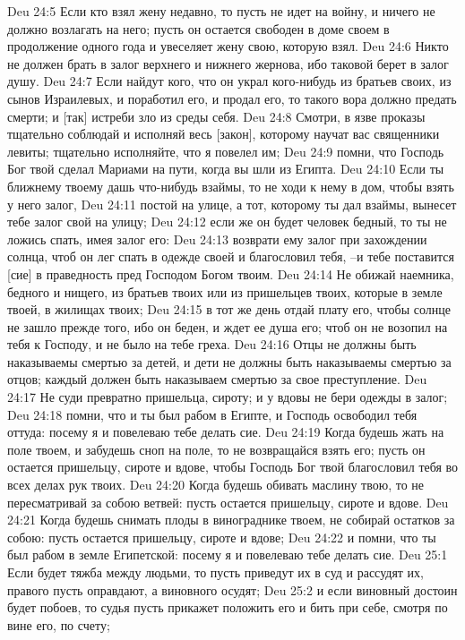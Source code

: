 Deu 24:5  Если кто взял жену недавно, то пусть не идет на войну, и ничего не должно возлагать на него; пусть он остается свободен в доме своем в продолжение одного года и увеселяет жену свою, которую взял.
Deu 24:6  Никто не должен брать в залог верхнего и нижнего жернова, ибо таковой берет в залог душу.
Deu 24:7  Если найдут кого, что он украл кого-нибудь из братьев своих, из сынов Израилевых, и поработил его, и продал его, то такого вора должно предать смерти; и [так] истреби зло из среды себя.
Deu 24:8  Смотри, в язве проказы тщательно соблюдай и исполняй весь [закон], которому научат вас священники левиты; тщательно исполняйте, что я повелел им;
Deu 24:9  помни, что Господь Бог твой сделал Мариами на пути, когда вы шли из Египта.
Deu 24:10  Если ты ближнему твоему дашь что-нибудь взаймы, то не ходи к нему в дом, чтобы взять у него залог,
Deu 24:11  постой на улице, а тот, которому ты дал взаймы, вынесет тебе залог свой на улицу;
Deu 24:12  если же он будет человек бедный, то ты не ложись спать, имея залог его:
Deu 24:13  возврати ему залог при захождении солнца, чтоб он лег спать в одежде своей и благословил тебя, --и тебе поставится [сие] в праведность пред Господом Богом твоим.
Deu 24:14  Не обижай наемника, бедного и нищего, из братьев твоих или из пришельцев твоих, которые в земле твоей, в жилищах твоих;
Deu 24:15  в тот же день отдай плату его, чтобы солнце не зашло прежде того, ибо он беден, и ждет ее душа его; чтоб он не возопил на тебя к Господу, и не было на тебе греха.
Deu 24:16  Отцы не должны быть наказываемы смертью за детей, и дети не должны быть наказываемы смертью за отцов; каждый должен быть наказываем смертью за свое преступление.
Deu 24:17  Не суди превратно пришельца, сироту; и у вдовы не бери одежды в залог;
Deu 24:18  помни, что и ты был рабом в Египте, и Господь освободил тебя оттуда: посему я и повелеваю тебе делать сие.
Deu 24:19  Когда будешь жать на поле твоем, и забудешь сноп на поле, то не возвращайся взять его; пусть он остается пришельцу, сироте и вдове, чтобы Господь Бог твой благословил тебя во всех делах рук твоих.
Deu 24:20  Когда будешь обивать маслину твою, то не пересматривай за собою ветвей: пусть остается пришельцу, сироте и вдове.
Deu 24:21  Когда будешь снимать плоды в винограднике твоем, не собирай остатков за собою: пусть остается пришельцу, сироте и вдове;
Deu 24:22  и помни, что ты был рабом в земле Египетской: посему я и повелеваю тебе делать сие.
Deu 25:1  Если будет тяжба между людьми, то пусть приведут их в суд и рассудят их, правого пусть оправдают, а виновного осудят;
Deu 25:2  и если виновный достоин будет побоев, то судья пусть прикажет положить его и бить при себе, смотря по вине его, по счету;
